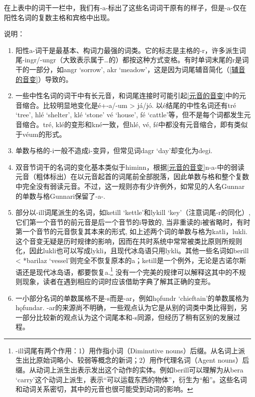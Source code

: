 在上表中的词干一栏中，我们有-a-标出了这些名词词干原有的样子，但是-a-仅在阳性名词的复数主格和宾格中出现。

说明：

\begin{enumerate}
\def\labelenumi{\arabic{enumi})}
\item
  阳性a-词干是最基本、构词力最强的词类。它的标志是主格的-r，许多派生词尾-ingr/-ungr（大致表示属于\ldots 的）都按这种方式变格。有时单词末尾的r是词干的一部分，如angr
  `sorrow', akr
  `meadow'，这是因为词尾辅音简化（\ref{辅音的音变}）导致的。
\item
  一些中性名词的词干中有长元音，和词尾连接时可能引起\ref{元音的音变}中的元音缩合。比较明显地变化是é+-a/-um
  \textgreater{} já/jó. 以é结尾的中性名词还有tré `tree', hlé `shelter',
  klé `stone' vé `house', fé
  `cattle'等，但不是每个词都发生元音缩合。tré,
  klé的变形和kné一致，但hlé, vé,
  fé中都没有元音缩合，即有类似于véum的形式。
\item
  单数与格的-i一般不造成i-变异，但常见词dagr `day'却变化为degi.
\item
  双音节词干的名词的变化基本类似于himinn，根据\ref{元音的音变}n-a-中的弱读元音（粗体标出）在以元音起首的词尾前全部脱落，因此单数与格和整个复数中完全没有弱读元音。不过，这一规则亦有少许例外，如常见的人名Gunnar的单数与格Gunnari保留了-a-.
\item
  部分以-ill词尾派生的名词，如ketill `kettle'和lykill
  `key'（注意词尾-r的同化）,
  它们第一个音节的前元音是后一个音节的i导致的,
  当非重读的i被省略时，有时第一个音节的元音恢复其本来的形式,
  如上述两个词的单数与格为katli，lukli.
  这个音变无疑是历时规律的影响，因而在共时系统中常常被类比原则所规则化，因此lukli也可以写成lykli，且现代冰岛语只用lykli。其他一些名词如berill
  \textless{} *barilaz
  `vessel'则完全不恢复原本的a；ketill是一个例外，无论是古诺尔斯语还是现代冰岛语，都要恢复a.\footnote{-ill词尾有两个作用：1）用作指小词（Diminutive
    nouns）后缀。从名词上派生出比原始词略小、较弱等概念的新词；2）用作代理名词（Agent
    nouns）后缀。从动词上派生出表示发出这个动作的实体。例如berill可以理解为从bera
    `carry'这个动词上派生，表示``可以运载东西的物体''，衍生为``船''。这些名词和动词关系密切，其中的元音也很可能受到动词的影响。}
  没有一个完美的规律可以解释这其中的不规则现象，读者在遇到相应的词时应该借助字典了解其正确的变形。
\item
  一小部分名词的单数属格不是-s而是-ar，例如hǫfundr
  `chieftain'的单数属格为hǫfundar.
  -ar的来源尚不明确，一些观点认为它是从别的词类中类比得到，另一部分比较新的观点认为这个词尾本和-s同源，但经历了稍有区别的发展过程。
\end{enumerate}

